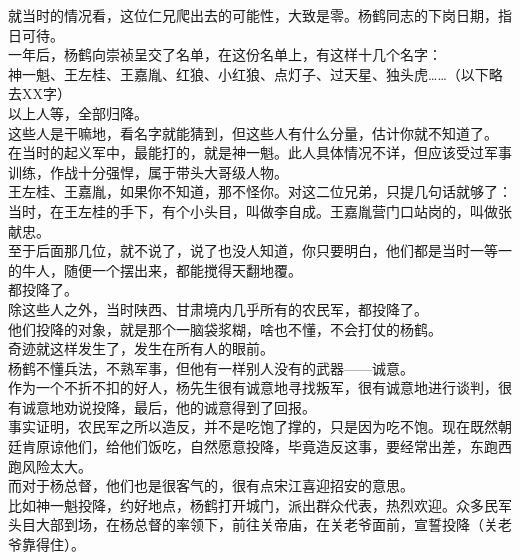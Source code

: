 \begin{multicols}{\theparacolNo}
就当时的情况看，这位仁兄爬出去的可能性，大致是零。杨鹤同志的下岗日期，指日可待。\\

一年后，杨鹤向崇祯呈交了名单，在这份名单上，有这样十几个名字：\\

神一魁、王左桂、王嘉胤、红狼、小红狼、点灯子、过天星、独头虎……（以下略去XX字）\\

以上人等，全部归降。\\

这些人是干嘛地，看名字就能猜到，但这些人有什么分量，估计你就不知道了。\\

在当时的起义军中，最能打的，就是神一魁。此人具体情况不详，但应该受过军事训练，作战十分强悍，属于带头大哥级人物。\\

王左桂、王嘉胤，如果你不知道，那不怪你。对这二位兄弟，只提几句话就够了：当时，在王左桂的手下，有个小头目，叫做李自成。王嘉胤营门口站岗的，叫做张献忠。\\

至于后面那几位，就不说了，说了也没人知道，你只要明白，他们都是当时一等一的牛人，随便一个摆出来，都能搅得天翻地覆。\\

都投降了。\\

除这些人之外，当时陕西、甘肃境内几乎所有的农民军，都投降了。\\

他们投降的对象，就是那个一脑袋浆糊，啥也不懂，不会打仗的杨鹤。\\

奇迹就这样发生了，发生在所有人的眼前。\\

杨鹤不懂兵法，不熟军事，但他有一样别人没有的武器——诚意。\\

作为一个不折不扣的好人，杨先生很有诚意地寻找叛军，很有诚意地进行谈判，很有诚意地劝说投降，最后，他的诚意得到了回报。\\

事实证明，农民军之所以造反，并不是吃饱了撑的，只是因为吃不饱。现在既然朝廷肯原谅他们，给他们饭吃，自然愿意投降，毕竟造反这事，要经常出差，东跑西跑风险太大。\\

而对于杨总督，他们也是很客气的，很有点宋江喜迎招安的意思。\\

比如神一魁投降，约好地点，杨鹤打开城门，派出群众代表，热烈欢迎。众多民军头目大部到场，在杨总督的率领下，前往关帝庙，在关老爷面前，宣誓投降（关老爷靠得住）。\\


\end{multicols}
